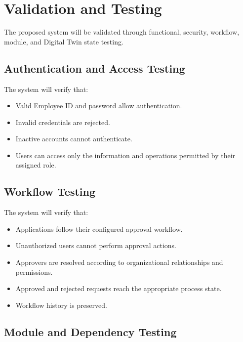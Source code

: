 \documentclass[12pt,a4paper]{article}
\begin{document}

\section{Validation and Testing}

The proposed system will be validated through functional,
security, workflow, module, and Digital Twin state testing.

\subsection{Authentication and Access Testing}

The system will verify that:

\begin{itemize}
    \item Valid Employee ID and password allow authentication.
    \item Invalid credentials are rejected.
    \item Inactive accounts cannot authenticate.
    \item Users can access only the information and operations
    permitted by their assigned role.
\end{itemize}

\subsection{Workflow Testing}

The system will verify that:

\begin{itemize}
    \item Applications follow their configured approval workflow.
    \item Unauthorized users cannot perform approval actions.
    \item Approvers are resolved according to organizational
    relationships and permissions.
    \item Approved and rejected requests reach the appropriate
    process state.
    \item Workflow history is preserved.
\end{itemize}

\subsection{Module and Dependency Testing}
\end{document}
